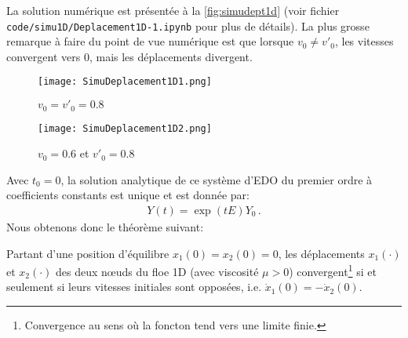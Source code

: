 La solution numérique est présentée à la \cref{fig:simudept1d} (voir fichier \verb|code/simu1D/Deplacement1D-1.ipynb| pour plus de détails). La plus grosse remarque à faire du point de vue numérique est que lorsque $v_0 \neq v'_0$, les vitesses convergent vers $0$, mais les déplacements divergent.
\begin{figure*}[!h]
    \centering

    \begin{subfigure}[t]{0.45\textwidth}
        \centering
        \texttt{[image: SimuDeplacement1D1.png]}
        \caption{$v_0=v'_0 = 0.8$}
    \end{subfigure}
    \begin{subfigure}[t]{0.45\textwidth}
        \centering
        \texttt{[image: SimuDeplacement1D2.png]}
        \caption{$v_0= 0.6$ et $v'_0 = 0.8$}
    \end{subfigure}

    \caption{Simulation du déplacement 1D d'un floe avec $m=1$, $k=18$, $\mu=1.3$, $t_{f}=5$. En règle générale, on observe le ralentissement du système et une convergence des déplacements vers l'état d'équilibre $Y_{eq}= (0,0,0,0)$ lorsque $v_0 = v'_0$.}
    \label{fig:simudept1d}
\end{figure*}

Avec $t_0= 0$, la solution analytique de ce système d'EDO du premier ordre à coefficients constants est unique et est donnée par:
\begin{align}
    Y(t) = \exp(tE)Y_0 \,.
\end{align}
Nous obtenons donc le théorème suivant:
\begin{theorem} \label{th:div1D}
    Partant d'une position d'équilibre $x_1(0) = x_2(0) = 0$, les déplacements $x_1(\cdot)$ et $x_2(\cdot)$ des deux n\oe{}uds du floe 1D (avec viscosité $\mu > 0$) convergent\footnote{Convergence au sens où la foncton tend vers une limite finie.} si et seulement si leurs vitesses initiales sont opposées, i.e. $\dot x_1(0) = - \dot x_2(0)$.
\end{theorem}

